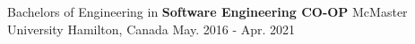 \begin{cventries}

  \cventry
    {Bachelors of Engineering in \textbf{Software Engineering CO-OP}} %
    {McMaster University} %
    {Hamilton, Canada} %
    {May. 2016 - Apr. 2021} %
    {}

\end{cventries}
